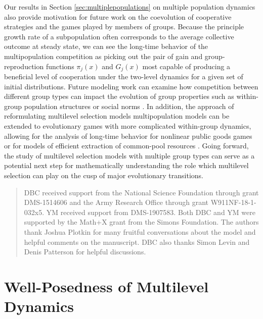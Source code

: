 \documentclass[11pt]{article}
\numberwithin{equation}{section}
\newcommand{\myindent}{\hspace{10mm}}
\begin{document}
{\myindent Our results in Section \ref{sec:multiplepopulations} on multiple population dynamics also provide motivation for future work on the coevolution of cooperative strategies and the games played by members of groups. Because the principle growth rate of a subpopulation often corresponds to the average collective outcome at steady state, we can see the long-time behavior of the multipopulation competition as picking out the pair of gain and group-reproduction functions $\pi_j(x)$ and $G_j(x)$ most capable of producing a beneficial level of cooperation under the two-level dynamics for a given set of initial distributions. Future modeling work can examine how competition between different group types can impact the evolution of group properties such as within-group population structures or social norms \cite{cooney2019assortment,santos2007multi}. In addition, the approach of reformulating multilevel selection models multipopulation models can be extended to evolutionary games with more complicated within-group dynamics, allowing for the analysis of long-time behavior for nonlinear public goods games \cite{archetti2011coexistence,pacheco2009evolutionary} or for models of efficient extraction of common-pool resources \cite{tavoni2012survival,tilman2017maintaining}. Going forward, the study of multilevel selection models with multiple group types can serve as a potential next step for mathematically understanding the role which multilevel selection can play on the cusp of major evolutionary transitions. 

\renewcommand{\abstractname}{Acknowledgments}
\begin{abstract} 
%
DBC received support from the National Science Foundation through grant DMS-1514606 and the Army Research Office through grant W911NF-18-1-032x5. YM received support from DMS-1907583. Both DBC and YM were supported by the Math+X grant from the Simons Foundation. The authors thank Joshua Plotkin for many fruitful conversations about the model and helpful comments on the manuscript. DBC also thanks Simon Levin and Denis Patterson for helpful discussions. 

\end{abstract}







\appendix


\section{Well-Posedness of Multilevel Dynamics}
\label{sec:wellposedness}

}
\end{document}
